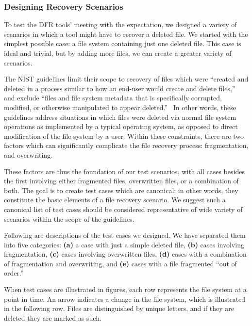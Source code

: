 \subsubsection{Designing Recovery Scenarios}
\begin{paraphrase}
 To test the DFR tools' meeting with the expectation, we designed a variety of scenarios in which a tool might have to recover a deleted file. 
We started with the simplest possible case: a file system containing just one deleted file. 
This case is ideal and trivial, but by adding more files, we can create a greater variety of scenarios.

The NIST guidelines limit their scope to recovery of files which were ``created and deleted in a process similar to 
how an end-user would create and delete files,''~\cite{meta:dfr:standards} and exclude 
``files and file system metadata that is specifically corrupted, modified, or otherwise manipulated to appear deleted.''~\cite{meta:dfr:standards}
In other words, these guidelines address situations in which files were deleted via normal file system operations as 
implemented by a typical operating system, as opposed to direct modification of the file system by a user.
Within these constraints, there are two factors which can significantly complicate the file recovery process: 
fragmentation, and overwriting. 

These factors are thus the foundation of our test scenarios, with all cases besides the first involving either fragmented files, overwritten files, or a combination of both. 
The goal is to create test cases which are canonical; in other words, they constitute the basic elements of a file recovery scenario.
We suggest such a canonical list of test cases should be considered representative of wide variety of scenarios within the scope of the guidelines.

Following are descriptions of the test cases we designed. 
We have separated them into five categories: 
{\bf(a)} a case with just a simple deleted file, 
{\bf (b)} cases involving fragmentation,
{\bf (c)} cases involving overwritten files,
{\bf (d)} cases with a combination of fragmentation and overwriting,
and {\bf (e)} cases with a file fragmented ``out of order.''

When test cases are illustrated in figures, each row represents the file system at a point in time. An arrow indicates a change in the file system, which is illustrated in the following row. Files are distinguished by unique letters, and if they are deleted they are marked as such.
\end{paraphrase}

